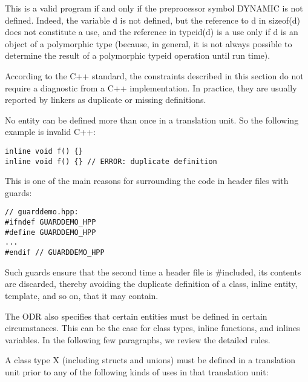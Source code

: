 This is a valid program if and only if the preprocessor symbol DYNAMIC is not defined. Indeed, the variable d is not defined, but the reference to d in sizeof(d) does not constitute a use, and the reference in typeid(d) is a use only if d is an object of a polymorphic type (because, in general, it is not always possible to determine the result of a polymorphic typeid operation until run time).

According to the C++ standard, the constraints described in this section do not require a diagnostic from a C++ implementation. In practice, they are usually reported by linkers as duplicate or missing definitions.


No entity can be defined more than once in a translation unit. So the following example is invalid C++:

\begin{lstlisting}[style=styleCXX]
inline void f() {}
inline void f() {} // ERROR: duplicate definition
\end{lstlisting}

This is one of the main reasons for surrounding the code in header files with guards:

\begin{lstlisting}[style=styleCXX]
// guarddemo.hpp:
#ifndef GUARDDEMO_HPP
#define GUARDDEMO_HPP
...
#endif // GUARDDEMO_HPP
\end{lstlisting}

Such guards ensure that the second time a header file is \#included, its contents are discarded, thereby avoiding the duplicate definition of a class, inline entity, template, and so on, that it may contain.

The ODR also specifies that certain entities must be defined in certain circumstances. This can be the case for class types, inline functions, and inlines variables. In the following few paragraphs, we review the detailed rules.

A class type X (including structs and unions) must be defined in a translation unit prior to any of the following kinds of uses in that translation unit:

